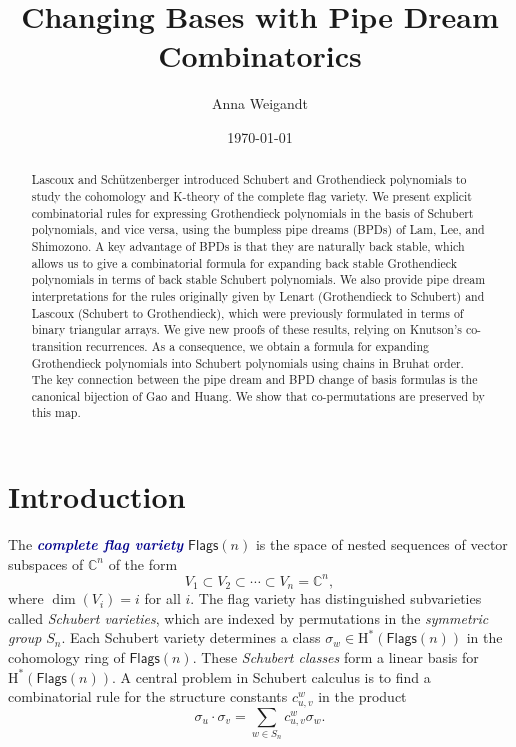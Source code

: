 \documentclass[12 pt]{amsart}
\title{Changing Bases with Pipe Dream Combinatorics}
\author{Anna Weigandt}
\date{\today}
\newcommand{\newword}[1]{\textcolor{darkblue}{\textbf{\emph{#1}}}}
\newcommand{\Flags}{\mathsf{Flags}}
\numberwithin{equation}{section}
\theoremstyle{remark}
\begin{document}
	

	
	\begin{abstract}
		Lascoux and Sch\"utzenberger introduced Schubert and Grothendieck polynomials to study the cohomology and K-theory of the complete flag variety. 
		We present explicit combinatorial rules for expressing Grothendieck polynomials in the basis of Schubert polynomials, and vice versa, using the bumpless pipe dreams (BPDs) of Lam, Lee, and Shimozono. 
		A key advantage of BPDs is that they are naturally back stable, which allows us to give a combinatorial formula for expanding back stable Grothendieck polynomials in terms of back stable Schubert polynomials.
		We also provide pipe dream interpretations for the rules originally given by Lenart (Grothendieck to Schubert) and Lascoux (Schubert to Grothendieck), which were previously formulated in terms of binary triangular arrays. 
		We give new proofs of these results, relying on Knutson's co-transition recurrences. 
		As a consequence, we obtain a formula for expanding Grothendieck polynomials into Schubert polynomials using chains in Bruhat order. 
		The key connection between the pipe dream and BPD change of basis formulas is the canonical bijection of Gao and Huang. 
		We show that co-permutations are preserved by this map.
	\end{abstract}

	\maketitle 
	
	\section{Introduction}
	
	The \newword{complete flag variety} $\Flags(n)$ is the space of nested sequences of vector subspaces of $\mathbb{C}^n$ of the form
	\[ V_1 \subset V_2 \subset \cdots \subset V_n=\mathbb{C}^n,\] 
	where $\dim(V_i)=i$ for all $i$. 
	The flag variety has distinguished subvarieties called \emph{Schubert varieties}, which are indexed by permutations in the \emph{symmetric group} $S_n$. 
	Each Schubert variety determines a class $\sigma_w\in \mathrm{H}^*(\Flags(n))$ in the cohomology ring of $\Flags(n)$. 
	These \emph{Schubert classes} form a linear basis for $\mathrm{H}^*(\Flags(n))$. 
	A central problem in Schubert calculus is to find a combinatorial rule for the structure constants $c_{u,v}^w$ in the product 
	\[\sigma_u \cdot \sigma_v=\sum_{w\in S_n}c_{u,v}^w \sigma_w.\] 
	
\end{document}
